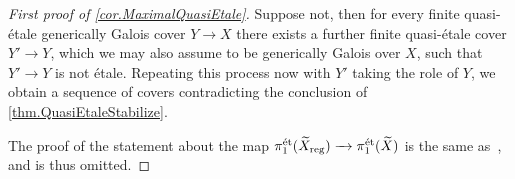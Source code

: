 \documentclass[12pt]{amsart}
\numberwithin{equation}{theorem}
\renewcommand{\:}{\colon}
\newcommand{\piet}{\pi_1^{\textnormal{\'{e}t}}} %
\theoremstyle{theorem}
\begin{document}
\begin{proof}[First proof of \autoref{cor.MaximalQuasiEtale}]
Suppose not, then for every finite quasi-\'etale generically Galois cover $Y \to X$ there exists a further finite quasi-\'etale cover $Y' \to Y$, which we may also assume to be generically Galois over $X$, such that $Y' \to Y$ is not \'etale.
Repeating this process now with $Y'$ taking the role of $Y$, we obtain a sequence of covers contradicting the conclusion of \autoref{thm.QuasiEtaleStabilize}.

The proof of the statement about the map $\piet(\tld X_{\reg}) \to \piet(\tld X)$ is the same as~\cite[Step 2 of the proof of Thm.~1.5]{GrebKebekusPeternellEtaleFundamental}, and is thus omitted.
\end{proof}
\end{document}

